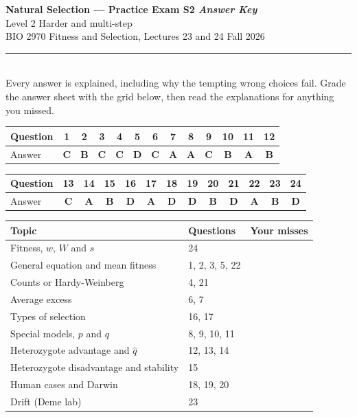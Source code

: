 \documentclass[11pt]{article}
\begin{document}
\begin{center}
  {\LARGE\bfseries Natural Selection --- Practice Exam S2 \textit{Answer Key}}\\[5pt]
  {\large Level 2 \quad\textbullet\quad Harder and multi-step}\\[6pt]
  BIO 2970 \quad\textbullet\quad Fitness and Selection, Lectures 23 and 24 \quad\textbullet\quad Fall 2026\\[3pt]
  \rule{\textwidth}{0.8pt}\\[3pt]
  {\small Every answer is explained, including why the tempting wrong choices fail. Grade the answer sheet with the grid below, then read the explanations for anything you missed.}
\end{center}
\vspace{0.4em}

\begin{center}\small\setlength{\tabcolsep}{6.2pt}\begin{tabular}{lcccccccccccc}
\toprule
Question & 1 & 2 & 3 & 4 & 5 & 6 & 7 & 8 & 9 & 10 & 11 & 12 \\
\midrule
Answer & \textbf{C} & \textbf{B} & \textbf{C} & \textbf{C} & \textbf{D} & \textbf{C} & \textbf{A} & \textbf{A} & \textbf{C} & \textbf{B} & \textbf{A} & \textbf{B} \\
\bottomrule\end{tabular}\end{center}
\begin{center}\small\setlength{\tabcolsep}{6.2pt}\begin{tabular}{lcccccccccccc}
\toprule
Question & 13 & 14 & 15 & 16 & 17 & 18 & 19 & 20 & 21 & 22 & 23 & 24 \\
\midrule
Answer & \textbf{C} & \textbf{A} & \textbf{B} & \textbf{D} & \textbf{A} & \textbf{D} & \textbf{D} & \textbf{B} & \textbf{D} & \textbf{A} & \textbf{B} & \textbf{D} \\
\bottomrule\end{tabular}\end{center}
\begin{center}\small\begin{tabular}{lll}\toprule Topic & Questions & Your misses\\\midrule
Fitness, \(w\), \(W\) and \(s\) & 24 & \\
General equation and mean fitness & 1, 2, 3, 5, 22 & \\
Counts or Hardy-Weinberg & 4, 21 & \\
Average excess & 6, 7 & \\
Types of selection & 16, 17 & \\
Special models, \(p\) and \(q\) & 8, 9, 10, 11 & \\
Heterozygote advantage and \(\hat{q}\) & 12, 13, 14 & \\
Heterozygote disadvantage and stability & 15 & \\
Human cases and Darwin & 18, 19, 20 & \\
Drift (Deme lab) & 23 & \\
\bottomrule\end{tabular}\end{center}
\end{document}
